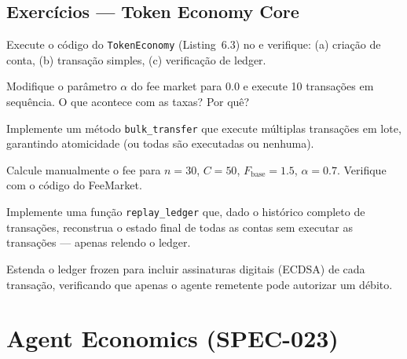 \subsection{Exercícios — Token Economy Core}

\begin{exercicio}
Execute o código do \lstinline{TokenEconomy} (Listing~6.3) no
\opencodeeco{} e verifique: (a) criação de conta, (b) transação
simples, (c) verificação de ledger.
\end{exercicio}

\begin{exercicio}
Modifique o parâmetro $\alpha$ do fee market para 0.0 e execute
10 transações em sequência. O que acontece com as taxas? Por quê?
\end{exercicio}

\begin{exercicio}
Implemente um método \lstinline{bulk_transfer} que execute
múltiplas transações em lote, garantindo atomicidade (ou todas
são executadas ou nenhuma).
\end{exercicio}

\begin{exercicio}
Calcule manualmente o fee para $n=30$, $C=50$, $F_{\text{base}}=1.5$,
$\alpha=0.7$. Verifique com o código do FeeMarket.
\end{exercicio}

\begin{exercicio}
Implemente uma função \lstinline{replay_ledger} que, dado o
histórico completo de transações, reconstrua o estado final de
todas as contas sem executar as transações — apenas relendo
o ledger.
\end{exercicio}

\begin{exercicio}
Estenda o ledger frozen para incluir assinaturas digitais
(ECDSA) de cada transação, verificando que apenas o agente
remetente pode autorizar um débito.
\end{exercicio}

\section{Agent Economics (SPEC-023)}
\label{sec:agent-economics}
\nivelavancado

